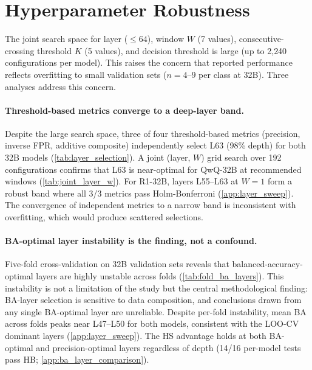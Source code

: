 \section{Hyperparameter Robustness}
\label{app:hyperparameter_robustness}

The joint search space for layer (${\leq}64$), window $W$ (7 values), consecutive-crossing threshold $K$ (5 values), and decision threshold is large (up to 2{,}240 configurations per model). This raises the concern that reported performance reflects overfitting to small validation sets ($n{=}4$--$9$ per class at 32B). Three analyses address this concern.

\paragraph{Threshold-based metrics converge to a deep-layer band.}
Despite the large search space, three of four threshold-based metrics (precision, inverse FPR, additive composite) independently select L63 (98\% depth) for both 32B models (\cref{tab:layer_selection}). A joint (layer, $W$) grid search over 192 configurations confirms that L63 is near-optimal for QwQ-32B at recommended windows (\cref{tab:joint_layer_w}). For R1-32B, layers L55--L63 at $W{=}1$ form a robust band where all 3/3 metrics pass Holm-Bonferroni (\cref{app:layer_sweep}). The convergence of independent metrics to a narrow band is inconsistent with overfitting, which would produce scattered selections.

\paragraph{BA-optimal layer instability is the finding, not a confound.}
Five-fold cross-validation on 32B validation sets reveals that balanced-accuracy-optimal layers are highly unstable across folds (\cref{tab:fold_ba_layers}). This instability is not a limitation of the study but the central methodological finding: BA-layer selection is sensitive to data composition, and conclusions drawn from any single BA-optimal layer are unreliable. Despite per-fold instability, mean BA across folds peaks near L47--L50 for both models, consistent with the LOO-CV dominant layers (\cref{app:layer_sweep}). The HS advantage holds at both BA-optimal and precision-optimal layers regardless of depth (14/16 per-model tests pass HB; \cref{app:ba_layer_comparison}).

\begin{table}[htbp]
\centering
\small
\caption{BA-optimal layer per fold (5-fold CV, 32B models). Per-fold selections span 24 layers, but mean-BA landscape peaks are stable.}
\label{tab:fold_ba_layers}
\end{table}

